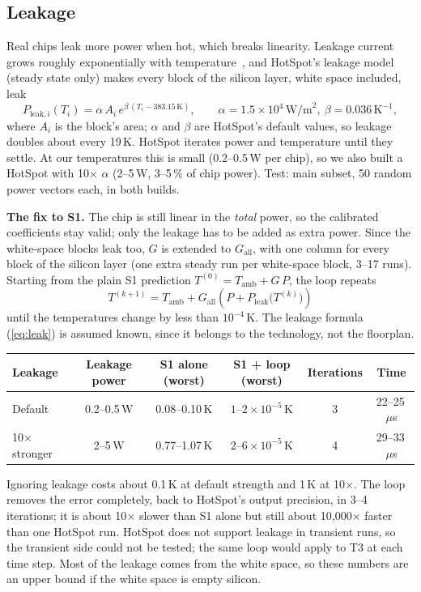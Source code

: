 \documentclass[11pt,a4paper]{article}
\newcommand{\us}{\,$\mu$s}
\begin{document}
\subsection{Leakage}
Real chips leak more power when hot, which breaks linearity. Leakage current grows roughly
exponentially with temperature~\cite{liao05}, and HotSpot's leakage model~\cite{hotspot6} (steady
state only) makes every block of the silicon layer, white space included, leak
\begin{equation}
  P_{\text{leak},i}(T_i) = \alpha\, A_i\, e^{\beta\,(T_i - 383.15\,\text{K})},
  \qquad \alpha = 1.5\times10^{4}\,\text{W/m}^2,\ \beta = 0.036\,\text{K}^{-1},
  \label{eq:leak}
\end{equation}
where $A_i$ is the block's area; $\alpha$ and $\beta$ are HotSpot's default values, so leakage
doubles about every 19\,K. HotSpot iterates power and temperature until they settle. At our
temperatures this is small (0.2--0.5\,W per chip), so we also built a HotSpot with 10$\times$
$\alpha$ (2--5\,W, 3--5\,\% of chip power). Test: main subset, 50 random power vectors each, in
both builds.

\textbf{The fix to S1.} The chip is still linear in the \emph{total} power, so the calibrated
coefficients stay valid; only the leakage has to be added as extra power. Since the white-space
blocks leak too, $G$ is extended to $G_\text{all}$, with one column for every block of the silicon
layer (one extra steady run per white-space block, 3--17 runs). Starting from the plain S1
prediction $T^{(0)} = T_\text{amb} + G\,P$, the loop repeats
\begin{equation}
  T^{(k+1)} = T_\text{amb} + G_\text{all}\left(P + P_\text{leak}\big(T^{(k)}\big)\right)
  \label{eq:leakloop}
\end{equation}
until the temperatures change by less than $10^{-4}$\,K. The leakage formula (\ref{eq:leak}) is
assumed known, since it belongs to the technology, not the floorplan.

\begin{center}
\small
\begin{tabular}{@{}l c c c c c@{}}
\toprule
Leakage & Leakage power & S1 alone (worst) & S1 + loop (worst) & Iterations & Time \\
\midrule
Default & 0.2--0.5\,W & 0.08--0.10\,K & $1$--$2\times10^{-5}$\,K & 3 & 22--25\us \\
10$\times$ stronger & 2--5\,W & 0.77--1.07\,K & $2$--$6\times10^{-5}$\,K & 4 & 29--33\us \\
\bottomrule
\end{tabular}
\end{center}
Ignoring leakage costs about 0.1\,K at default strength and 1\,K at 10$\times$. The loop removes
the error completely, back to HotSpot's output precision, in 3--4 iterations; it is about
10$\times$ slower than S1 alone but still about 10{,}000$\times$ faster than one HotSpot run.
HotSpot does not support leakage in transient runs, so the transient side could not be tested;
the same loop would apply to T3 at each time step. Most of the leakage comes from the white space,
so these numbers are an upper bound if the white space is empty silicon.
\end{document}
